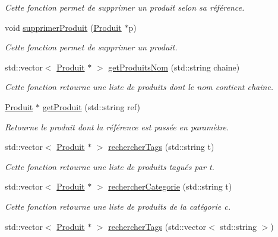\begin{DoxyCompactItemize}
\begin{DoxyCompactList}\small\item\em Cette fonction permet de supprimer un produit selon sa référence. \end{DoxyCompactList}\item 
void \hyperlink{class_les_produits_acb7607cf2d8e004ed0018db6b56ebc3f}{supprimer\-Produit} (\hyperlink{class_produit}{Produit} $\ast$p)
\begin{DoxyCompactList}\small\item\em Cette fonction permet de supprimer un produit. \end{DoxyCompactList}\item 
std\-::vector$<$ \hyperlink{class_produit}{Produit} $\ast$ $>$ \hyperlink{class_les_produits_aae4aa0a260d282dd98a7f6beef1cebef}{get\-Produits\-Nom} (std\-::string chaine)
\begin{DoxyCompactList}\small\item\em Cette fonction retourne une liste de produits dont le nom contient chaine. \end{DoxyCompactList}\item 
\hyperlink{class_produit}{Produit} $\ast$ \hyperlink{class_les_produits_a4ed0454dafdbb5ee28424bdc0bbff1de}{get\-Produit} (std\-::string ref)
\begin{DoxyCompactList}\small\item\em Retourne le produit dont la référence est passée en paramètre. \end{DoxyCompactList}\item 
std\-::vector$<$ \hyperlink{class_produit}{Produit} $\ast$ $>$ \hyperlink{class_les_produits_aa3e835fe433b7c350c92c4f20e4162c0}{rechercher\-Tags} (std\-::string t)
\begin{DoxyCompactList}\small\item\em Cette fonction retourne une liste de produits tagués par t. \end{DoxyCompactList}\item 
std\-::vector$<$ \hyperlink{class_produit}{Produit} $\ast$ $>$ \hyperlink{class_les_produits_a86a0c66d67118ec32e9b34475dd42def}{rechercher\-Categorie} (std\-::string t)
\begin{DoxyCompactList}\small\item\em Cette fonction retourne une liste de produits de la catégorie c. \end{DoxyCompactList}\item 
std\-::vector$<$ \hyperlink{class_produit}{Produit} $\ast$ $>$ \hyperlink{class_les_produits_a6b48c5f164b34c4d1307cb897c62bbed}{rechercher\-Tags} (std\-::vector$<$ std\-::string $>$)

\end{DoxyCompactItemize}
